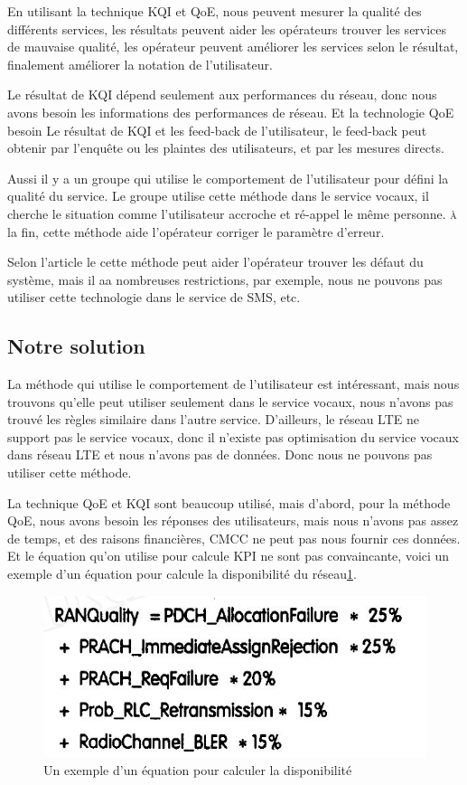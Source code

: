 En utilisant la technique KQI et QoE, nous peuvent mesurer la qualité des différents services, les résultats peuvent aider les opérateurs trouver les services de mauvaise qualité, les opérateur peuvent améliorer les services selon le résultat, finalement améliorer la notation de l'utilisateur.  

Le résultat de KQI dépend seulement aux performances du réseau, donc nous avons besoin les informations des performances de réseau. Et la technologie QoE besoin Le résultat de KQI et les feed-back de l'utilisateur, le feed-back peut obtenir par l'enquête ou les plaintes des utilisateurs,  et par les mesures directs.

Aussi il y a un groupe qui utilise le comportement de l'utilisateur pour défini la qualité du service\cite{UB}. Le groupe utilise cette méthode dans le service vocaux, il cherche le situation comme l'utilisateur accroche et ré-appel le même personne. \textsc{à} la fin, cette méthode aide l'opérateur corriger le paramètre d'erreur.

Selon l'article le cette méthode peut aider l'opérateur trouver les défaut du système, mais il aa nombreuses restrictions, par exemple, nous ne pouvons pas utiliser cette technologie dans le service de SMS, etc.

\subsection{Notre solution}

La méthode qui utilise le comportement de l'utilisateur est intéressant, mais nous trouvons qu'elle peut utiliser seulement dans le service vocaux, nous n'avons pas trouvé les règles similaire dans l'autre service. D'ailleurs, le réseau LTE ne support pas le service vocaux, donc il n'existe pas optimisation du service vocaux dans réseau LTE et nous n'avons pas de données. Donc nous ne pouvons pas utiliser cette méthode.

La technique QoE et KQI sont beaucoup utilisé, mais d'abord, pour la méthode QoE, nous avons besoin les réponses des utilisateurs, mais nous n'avons pas assez de temps, et des raisons financières, CMCC ne peut pas nous fournir ces données. Et le équation qu'on utilise pour calcule KPI ne sont pas convaincante, voici un exemple d'un équation pour calcule la disponibilité du réseau\ref{fig:kpi}. 
\begin{figure}[H]
\centering
\includegraphics[width=0.7\linewidth]{images/kpi}
\caption{Un exemple d'un équation pour calculer la disponibilité}
\label{fig:kpi}
\end{figure}

